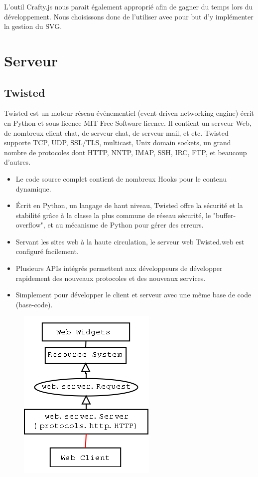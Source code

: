 \documentclass[a4paper,10pt]{report}
\begin{document}
L'outil Crafty.js nous parait également approprié afin de gagner du temps lors du développement. Nous choisissons donc de l'utiliser avec pour but d'y implémenter la gestion du SVG.



\chapter{Serveur}

  \section{Twisted}
Twisted est un moteur réseau événementiel (event-driven networking engine) écrit en Python et sous licence MIT Free Software licence. Il contient un serveur Web, de nombreux client chat, de serveur chat, de serveur mail, et etc. Twisted supporte TCP, UDP, SSL/TLS, multicast, Unix domain sockets, un grand nombre de protocoles dont HTTP, NNTP, IMAP, SSH, IRC, FTP, et beaucoup d'autres.
\begin{itemize}
\item Le code source complet contient de nombreux Hooks pour le contenu dynamique.
\item Écrit en Python, un langage de haut niveau, Twisted offre la sécurité et la stabilité grâce à la classe la plus commune de réseau sécurité, le "buffer-overflow", et au mécanisme de Python pour gérer des erreurs. 
\item Servant les sites web à la haute circulation, le serveur web Twisted.web est configuré facilement.
\item Plusieurs APIs intégrés permettent aux développeurs de développer rapidement des nouveaux protocoles et des nouveaux services.
\item Simplement pour développer le client et serveur avec une même base de code (base-code).
\end{itemize}


\begin{figure}[!ht]
  \centering
  \includegraphics[scale=0.7, bb=0 0 251 314]{img/Twisted.png}     
\end{figure} 
\end{document}
